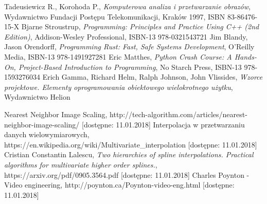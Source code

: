 \documentclass[twoside]{projektInzynierskiMS}
\begin{document}
\begin{thebibliography}{12}

 Tadeusiewicz R., Korohoda P., \emph{Komputerowa analiza i przetwarzanie obrazów}, Wydawnictwo Fundacji Postępu Telekomunikacji, Kraków 1997, ISBN 83-86476-15-X
Bjarne Stroustrup, \emph{Programming: Principles and Practice Using C++ (2nd Edition)}, Addison-Wesley Professional, ISBN-13 978-0321543721
 Jim Blandy, Jason Orendorff, \emph{Programming Rust: Fast, Safe Systems Development}, O'Reilly Media, ISBN-13 978-1491927281
 Eric Matthes, \emph{Python Crash Course: A Hands-On, Project-Based Introduction to Programming}, No Starch Press, ISBN-13 978-1593276034
     Erich Gamma, Richard Helm, Ralph Johnson, John Vlissides, \emph{Wzorce projektowe. Elementy oprogramowania obiektowego wielokrotnego użytku},  	Wydawnictwo Helion

 Nearest Neighbor Image Scaling, http://tech-algorithm.com/articles/nearest-neighbor-image-scaling/ [dostępne: 11.01.2018]
Interpolacja w przetwarzaniu danych wielowymiarowych, https://en.wikipedia.org/wiki/Multivariate\_interpolation [dostępne: 11.01.2018]
 Cristian Constantin Lalescu, \emph{Two hierarchies of spline interpolations.  Practical algorithms for multivariate higher order splines.}, https://arxiv.org/pdf/0905.3564.pdf [dostępne: 11.01.2018]
 Charles Poynton - Video engineering, http://poynton.ca/Poynton-video-eng.html [dostępne: 11.01.2018]

\end{thebibliography}
\end{document}
